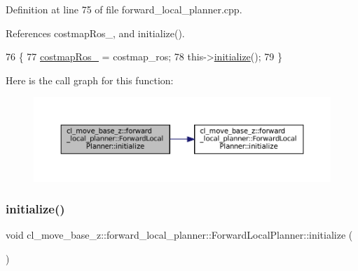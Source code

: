 Definition at line 75 of file forward\+\_\+local\+\_\+planner.\+cpp.



References costmap\+Ros\+\_\+, and initialize().


\begin{DoxyCode}
76 \{
77     \hyperlink{classcl__move__base__z_1_1forward__local__planner_1_1ForwardLocalPlanner_a37791fea67ce92c6e38e3727311e533b}{costmapRos\_} = costmap\_ros;
78     this->\hyperlink{classcl__move__base__z_1_1forward__local__planner_1_1ForwardLocalPlanner_ab455a974d5dcffda7e9772023840c7e6}{initialize}();
79 \}
\end{DoxyCode}
Here is the call graph for this function\+:
\nopagebreak
\begin{figure}[H]
\begin{center}
\leavevmode
\includegraphics[width=350pt]{classcl__move__base__z_1_1forward__local__planner_1_1ForwardLocalPlanner_a5ef0a220f6ff05f7cd9128c6b5d4d165_cgraph}
\end{center}
\end{figure}
\mbox{\label{classcl__move__base__z_1_1forward__local__planner_1_1ForwardLocalPlanner_ab455a974d5dcffda7e9772023840c7e6}} 
\subsubsection{\texorpdfstring{initialize()}{initialize()}\hspace{0.1cm}{\footnotesize\ttfamily [3/3]}}
{\footnotesize\ttfamily void cl\+\_\+move\+\_\+base\+\_\+z\+::forward\+\_\+local\+\_\+planner\+::\+Forward\+Local\+Planner\+::initialize (\begin{DoxyParamCaption}{ }\end{DoxyParamCaption})}



